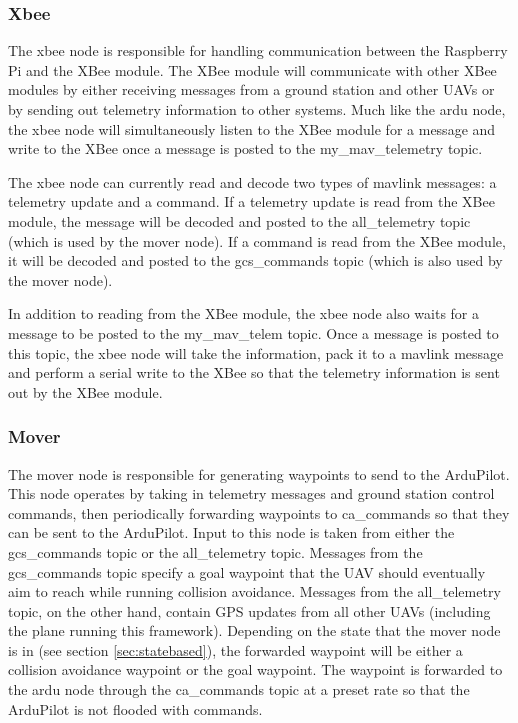\documentclass[conference]{IEEEtran}
\begin{document}
\subsubsection{Xbee}

The xbee node is responsible for handling communication between the Raspberry Pi and the XBee module.  The XBee module will communicate with other XBee modules by either receiving messages from a ground station and other UAVs or by sending out telemetry information to other systems.  Much like the ardu node, the xbee node will simultaneously listen to the XBee module for a message and write to the XBee once a message is posted to the my\_mav\_telemetry topic.  

The xbee node can currently read and decode two types of mavlink messages: a telemetry update and a command.  If a telemetry update is read from the XBee module, the message will be decoded and posted to the all\_telemetry topic (which is used by the mover node). If a command is read from the XBee module, it will be decoded and posted to the gcs\_commands topic (which is also used by the mover node).  

In addition to reading from the XBee module, the xbee node also waits for a message to be posted to the my\_mav\_telem topic.  Once a message is posted to this topic, the xbee node will take the information, pack it to a mavlink message and perform a serial write to the XBee so that the telemetry information is sent out by the XBee module.


\subsubsection{Mover}
The mover node is responsible for generating waypoints to send to the ArduPilot. 
This node operates by taking in telemetry messages and ground station control commands, then periodically forwarding waypoints to ca\_commands so that they can be sent to the ArduPilot.  Input to this node is taken from either the gcs\_commands topic or the all\_telemetry topic.  Messages from the gcs\_commands topic specify a goal waypoint that the UAV should eventually aim to reach while running collision avoidance.  Messages from the all\_telemetry topic, on the other hand, contain GPS updates from all other UAVs (including the plane running this framework). Depending on the state that the mover node is in (see section \ref{sec:statebased}), the forwarded waypoint will be either a collision avoidance waypoint or the goal waypoint. 
The waypoint is forwarded to the ardu node through the ca\_commands topic at a preset rate so that the ArduPilot is not flooded with commands.
\end{document}
